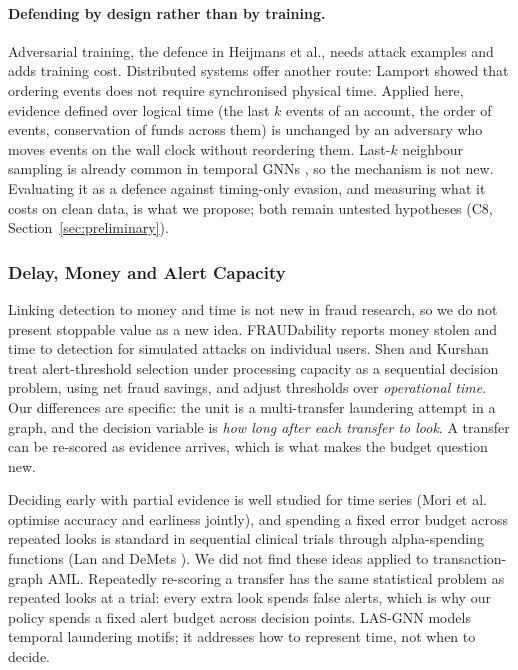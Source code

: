 \documentclass[11pt,a4paper]{article}
\begin{document}
\paragraph{Defending by design rather than by training.} Adversarial training, the defence in Heijmans et al., needs attack examples and adds training cost. Distributed systems offer another route: Lamport \cite{lamport1978clocks} showed that ordering events does not require synchronised physical time. Applied here, evidence defined over logical time (the last $k$ events of an account, the order of events, conservation of funds across them) is unchanged by an adversary who moves events on the wall clock without reordering them. Last-$k$ neighbour sampling is already common in temporal GNNs \cite{rossi2020tgn}, so the mechanism is not new. Evaluating it as a defence against timing-only evasion, and measuring what it costs on clean data, is what we propose; both remain untested hypotheses (C8, Section~\ref{sec:preliminary}).

\subsubsection{Delay, Money and Alert Capacity}
Linking detection to money and time is not new in fraud research, so we do not present stoppable value as a new idea. FRAUDability \cite{doytshman2023fraudability} reports money stolen and time to detection for simulated attacks on individual users. Shen and Kurshan \cite{shen2020dqn} treat alert-threshold selection under processing capacity as a sequential decision problem, using net fraud savings, and adjust thresholds over \emph{operational time}. Our differences are specific: the unit is a multi-transfer laundering attempt in a graph, and the decision variable is \emph{how long after each transfer to look}. A transfer can be re-scored as evidence arrives, which is what makes the budget question new.

Deciding early with partial evidence is well studied for time series (Mori et al.\ \cite{mori2018early} optimise accuracy and earliness jointly), and spending a fixed error budget across repeated looks is standard in sequential clinical trials through alpha-spending functions (Lan and DeMets \cite{lan1983alpha}). We did not find these ideas applied to transaction-graph AML. Repeatedly re-scoring a transfer has the same statistical problem as repeated looks at a trial: every extra look spends false alerts, which is why our policy spends a fixed alert budget across decision points. LAS-GNN \cite{verlaan2025lasgnn} models temporal laundering motifs; it addresses how to represent time, not when to decide.
\end{document}
